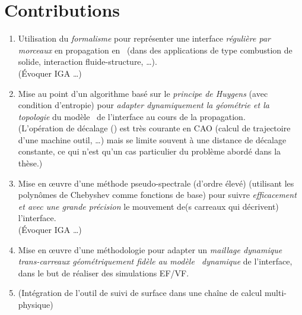 \section*{Contributions}

\begin{enumerate}
	\item Utilisation du \emph{formalisme \brep} pour représenter une interface \textit{régulière par morceaux} en propagation en \troisD\ (dans des applications de type combustion de solide, interaction fluide-structure, \ldots).\\
	(Évoquer IGA \ldots)
	
	\item Mise au point d’un algorithme basé sur le \emph{principe de Huygens} (avec condition d’entropie) pour \emph{adapter dynamiquement la géométrie et la topologie} du modèle \brep\ de l’interface au cours de la propagation.\\
	(L'opération de décalage () est très courante en CAO (calcul de trajectoire d'une machine outil, \ldots) mais se limite souvent à une distance de décalage constante, ce qui n'est qu'un cas particulier du problème abordé dans la thèse.)
	
	
	\item Mise en \oe uvre d’une méthode pseudo-spectrale (d’ordre élevé) (utilisant les polynômes de Chebyshev comme fonctions de base) pour suivre \emph{efficacement et avec une grande précision} le mouvement de(s carreaux qui décrivent) l’interface.\\
	(Évoquer IGA \ldots)
	
	\item Mise en \oe uvre d’une méthodologie pour adapter un \emph{maillage dynamique trans-carreaux géométriquement fidèle au modèle \brep\ dynamique} de l’interface, dans le but de réaliser des simulations EF/VF.\\
	
	
	\item (Intégration de l'outil de suivi de surface dans une chaîne de calcul multi-physique)
\end{enumerate}



